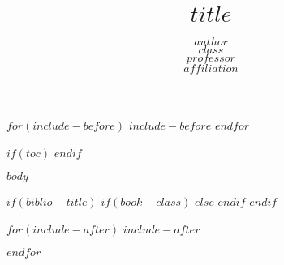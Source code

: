 \documentclass[a4paper,11pt]{article}
\title{$title$}
\author{$author$ \\ {\small  $class$} \\ {\small $professor$} \\ {\small $affiliation$}}
\begin{document}
\doublespacing

\maketitle

$for(include-before)$
$include-before$
$endfor$

\singlespacing


$if(toc)$
{
\clearpage
\hypersetup{linkcolor=black}
\setcounter{tocdepth}{$toc-depth$}
\tableofcontents
\clearpage
}
$endif$



$body$

$if(biblio-title)$
$if(book-class)$
\renewcommand\bibname{$biblio-title$}
$else$
\renewcommand\refname{$biblio-title$}
$endif$
$endif$



$for(include-after)$
$include-after$

$endfor$
\end{document}
